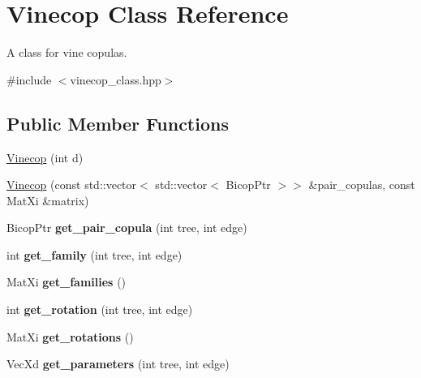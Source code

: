 \hypertarget{class_vinecop}{}\section{Vinecop Class Reference}
\label{class_vinecop}


A class for vine copulas.  




{\ttfamily \#include $<$vinecop\+\_\+class.\+hpp$>$}

\subsection*{Public Member Functions}
\begin{DoxyCompactItemize}
\item 
\hyperlink{class_vinecop_ac2b043db375e4127234c066ba3b2412e}{Vinecop} (int d)
\item 
\hyperlink{class_vinecop_af7b728d1bc489c6c87e6afb31e82ac06}{Vinecop} (const std\+::vector$<$ std\+::vector$<$ Bicop\+Ptr $>$$>$ \&pair\+\_\+copulas, const Mat\+Xi \&matrix)
\item 
Bicop\+Ptr {\bfseries get\+\_\+pair\+\_\+copula} (int tree, int edge)\hypertarget{class_vinecop_abd9dec1c010eec23f75ee0c8e52384bd}{}\label{class_vinecop_abd9dec1c010eec23f75ee0c8e52384bd}

\item 
int {\bfseries get\+\_\+family} (int tree, int edge)\hypertarget{class_vinecop_a30c95180a72665208e146a4202dcf3d9}{}\label{class_vinecop_a30c95180a72665208e146a4202dcf3d9}

\item 
Mat\+Xi {\bfseries get\+\_\+families} ()\hypertarget{class_vinecop_ae2c34ebbdd6cf388559829de790a3c9c}{}\label{class_vinecop_ae2c34ebbdd6cf388559829de790a3c9c}

\item 
int {\bfseries get\+\_\+rotation} (int tree, int edge)\hypertarget{class_vinecop_a8c2d5cc23ce33027d4024a4d7702e854}{}\label{class_vinecop_a8c2d5cc23ce33027d4024a4d7702e854}

\item 
Mat\+Xi {\bfseries get\+\_\+rotations} ()\hypertarget{class_vinecop_ad71c803ec5f5966a2cde7c14493e4644}{}\label{class_vinecop_ad71c803ec5f5966a2cde7c14493e4644}

\item 
Vec\+Xd {\bfseries get\+\_\+parameters} (int tree, int edge)\hypertarget{class_vinecop_ae0b65eba272c6a2868d1db9f04e1fdbf}{}\label{class_vinecop_ae0b65eba272c6a2868d1db9f04e1fdbf}


\end{DoxyCompactItemize}
